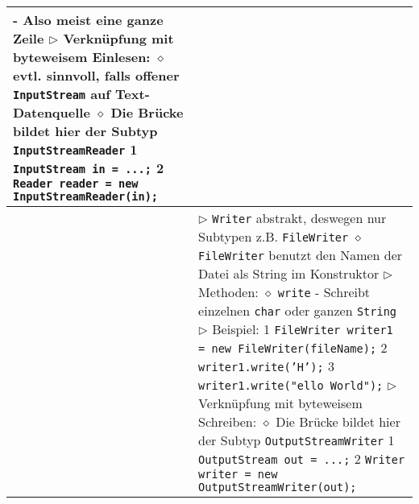 \begin{longtable}{ | p{} p{} | }
{	\hspace{0.6cm} - Also meist eine ganze Zeile \\
	$\triangleright$ Verknüpfung mit byteweisem Einlesen: \\
	\hspace{0.4cm} $\diamond$ evtl. sinnvoll, falls offener \texttt{InputStream} auf Text-Datenquelle \\
	\hspace{0.4cm} $\diamond$ Die Brücke bildet hier der Subtyp \texttt{InputStreamReader} \\
	\hspace{0.4cm} 1 \hspace{0.1cm} \texttt{InputStream in = ...;} \\
	\hspace{0.4cm} 2 \hspace{0.1cm} \texttt{Reader reader = new InputStreamReader(in);}} \\ \hline

	\makecell[l]{Textdaten schreiben} & \makecell[l]{
	$\triangleright$ \texttt{Writer} abstrakt, deswegen nur Subtypen z.B. \texttt{FileWriter} \\
	\hspace{0.4cm} $\diamond$ \texttt{FileWriter} benutzt den Namen der Datei als String im Konstruktor \\
	$\triangleright$ Methoden: \\
	\hspace{0.4cm} $\diamond$ \texttt{write} \\
	\hspace{0.6cm} - Schreibt einzelnen \texttt{char} oder ganzen \texttt{String} \\
	$\triangleright$ Beispiel: \\
	\hspace{0.4cm} 1 \hspace{0.1cm} \texttt{FileWriter writer1 = new FileWriter(fileName);} \\
	\hspace{0.4cm} 2 \hspace{0.1cm} \texttt{writer1.write('H');} \\
	\hspace{0.4cm} 3 \hspace{0.1cm} \texttt{writer1.write(\string"ello World\string");} \\ 
	$\triangleright$ Verknüpfung mit byteweisem Schreiben: \\
	\hspace{0.4cm} $\diamond$ Die Brücke bildet hier der Subtyp \texttt{OutputStreamWriter} \\
	\hspace{0.4cm} 1 \hspace{0.1cm} \texttt{OutputStream out = ...;} \\
	\hspace{0.4cm} 2 \hspace{0.1cm} \texttt{Writer writer = new OutputStreamWriter(out);} } \\ \hline

	\end{longtable}

